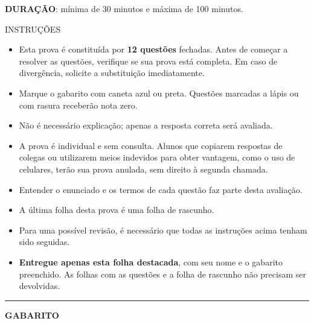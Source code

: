 \begin{titlepage}
\begin{tcolorbox}[width=\linewidth,colback=white]
    \end{tcolorbox}
    
    \noindent\textbf{DURAÇÃO}: mínima de 30 minutos e máxima de 100 minutos. \hfill \boxed{\numProva}
    
    \vspace{13pt}
    
    \begin{center}
        INSTRUÇÕES
    \end{center}

    \begin{itemize}[left=0pt, topsep=2pt, itemsep=2pt, parsep=0pt]
        \small
        \item Esta prova é constituída por \textbf{12 questões} fechadas. Antes de começar a resolver as questões, verifique se sua prova está completa. Em caso de divergência, solicite a substituição imediatamente.
        \item Marque o gabarito com caneta azul ou preta. Questões marcadas a lápis ou com rasura receberão nota zero.
        \item Não é necessário explicação; apenas a resposta correta será avaliada.
        \item A prova é individual e sem consulta. Alunos que copiarem respostas de colegas ou utilizarem meios indevidos para obter vantagem, como o uso de celulares, terão sua prova anulada, sem direito à segunda chamada.
        \item Entender o enunciado e os termos de cada questão faz parte desta avaliação.
        \item A última folha desta prova é uma folha de rascunho.
        \item Para uma possível revisão, é necessário que todas as instruções acima tenham sido seguidas.
        \item \textbf{Entregue apenas esta folha destacada}, com seu nome e o gabarito preenchido. As folhas com as questões e a folha de rascunho não precisam ser devolvidas.
    \end{itemize}

    \noindent\rule{\linewidth}{1pt}  %
    \vspace{10pt}
    
    \begin{center}
        \textbf{GABARITO}
    \end{center}
    \vspace{10pt}


\end{titlepage}
